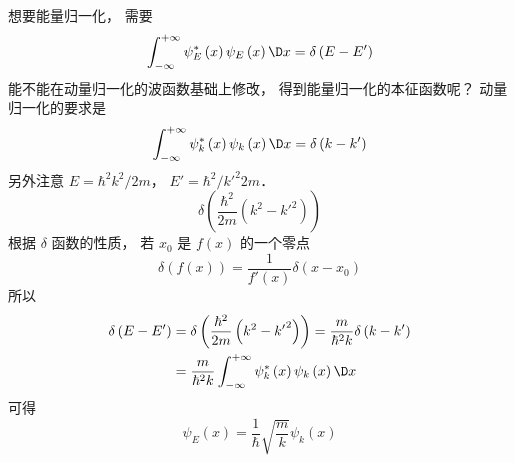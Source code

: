 
想要能量归一化， 需要
 \begin{equation}
  \int_{ - \infty }^{ + \infty } {\psi_E^ * \left( x \right){\psi_E}\left( x \right)\D x}  = \delta \left( {E - E'} \right)
\end{equation}
能不能在动量归一化的波函数基础上修改， 得到能量归一化的本征函数呢？
动量归一化的要求是
 \begin{equation}
  \int_{ - \infty }^{ + \infty } {\psi_k^ * \left( x \right){\psi_k}\left( x \right)\D x}  = \delta \left( {k - k'} \right)
\end{equation}
另外注意 $E = {{{\hbar ^2}{k^2}}}/{{2m}}$，   $E' = {{{\hbar ^2}/{{k'}^2}}}{{2m}}$． 
 \begin{equation}
  \delta \left( {\frac{{{\hbar ^2}}}{{2m}}\left( {{k^2} - {{k'}^2}} \right)} \right)
\end{equation}
根据 $\delta $ 函数的性质， 若 ${x_0}$ 是 $f\left( x \right)$ 的一个零点
 \begin{equation}
  \delta \left( {f\left( x \right)} \right) = \frac{1}{{f'\left( x \right)}}\delta \left( {x - {x_0}} \right)
\end{equation}
所以
 \begin{equation}
 \begin{aligned}
\delta \left( {E - E'} \right)& = \delta \left( {\frac{{{\hbar ^2}}}{{2m}}\left( {{k^2} - {{k'}^2}} \right)} \right) = \frac{m}{{{\hbar ^2}k}}\delta \left( {k - k'} \right) \\
&= \frac{m}{{{\hbar ^2}k}}\int_{ - \infty }^{ + \infty } {\psi_k^ * \left( x \right){\psi_k}\left( x \right)\D x} 
 \end{aligned}
\end{equation}
可得
 \begin{equation}
  {\psi_E}\left( x \right) = \frac{1}{\hbar }\sqrt {\frac{m}{k}} {\psi_k}\left( x \right)
\end{equation}


